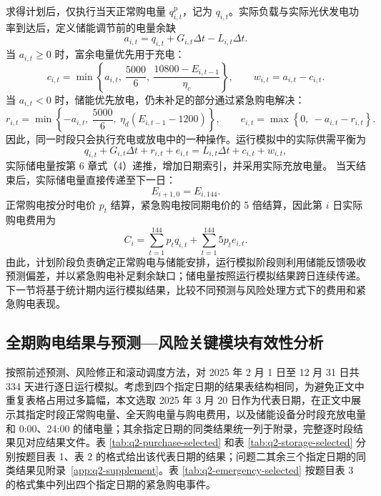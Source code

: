 \documentclass[12pt,a4paper]{ctexart}
\begin{document}
\par\noindent\hspace*{2em}求得计划后，仅执行当天正常购电量 $q_{i,t}^{\mathrm{p}}$，记为 $q_{i,t}$。实际负载与实际光伏发电功率到达后，定义储能调节前的电量余缺
\begin{equation}
a_{i,t}=q_{i,t}+G_{i,t}\Delta t-L_{i,t}\Delta t.
\end{equation}
当 $a_{i,t}\geq0$ 时，富余电量优先用于充电：
\begin{equation}
c_{i,t}=\min\left\{a_{i,t},\ \frac{5000}{6},\ \frac{10800-E_{i,t-1}}{\eta_c}\right\},\qquad w_{i,t}=a_{i,t}-c_{i,t}.
\end{equation}
当 $a_{i,t}<0$ 时，储能优先放电，仍未补足的部分通过紧急购电解决：
\begin{equation}
r_{i,t}=\min\left\{-a_{i,t},\ \frac{5000}{6},\ \eta_d\left(E_{i,t-1}-1200\right)\right\},\qquad e_{i,t}=\max\left\{0,\ -a_{i,t}-r_{i,t}\right\}.
\end{equation}
因此，同一时段只会执行充电或放电中的一种操作。运行模拟中的实际供需平衡为
\begin{equation}
q_{i,t}+G_{i,t}\Delta t+r_{i,t}+e_{i,t}=L_{i,t}\Delta t+c_{i,t}+w_{i,t},
\end{equation}
实际储电量按第 6 章式（4）递推，增加日期索引，并采用实际充放电量。
当天结束后，实际储电量直接传递至下一日：
\begin{equation}
E_{i+1,0}=E_{i,144}.
\end{equation}
正常购电按分时电价 $p_t$ 结算，紧急购电按同期电价的 5 倍结算，因此第 $i$ 日实际购电费用为
\begin{equation}
C_i=\sum_{t=1}^{144}p_tq_{i,t}+\sum_{t=1}^{144}5p_te_{i,t}.
\end{equation}
由此，计划阶段负责确定正常购电与储能安排，运行模拟阶段则利用储能反馈吸收预测偏差，并以紧急购电补足剩余缺口；储电量按照运行模拟结果跨日连续传递。下一节将基于统计期内运行模拟结果，比较不同预测与风险处理方式下的费用和紧急购电表现。
\subsection{全期购电结果与预测—风险关键模块有效性分析}
按照前述预测、风险修正和滚动调度方法，对 2025 年 2 月 1 日至 12 月 31 日共 334 天进行逐日运行模拟。考虑到四个指定日期的结果表结构相同，为避免正文中重复表格占用过多篇幅，本文选取 2025 年 3 月 20 日作为代表日期，在正文中展示其指定时段正常购电量、全天购电量与购电费用，以及储能设备分时段充放电量和 0:00、24:00 的储电量；其余指定日期的同类结果统一列于附录，完整逐时段结果见对应结果文件。表 \ref{tab:q2-purchase-selected} 和表 \ref{tab:q2-storage-selected} 分别按题目表 1、表 2 的格式给出该代表日期的结果；问题二其余三个指定日期的同类结果见附录~\ref{app:q2-supplement}。表 \ref{tab:q2-emergency-selected} 按题目表 3 的格式集中列出四个指定日期的紧急购电事件。
\end{document}
